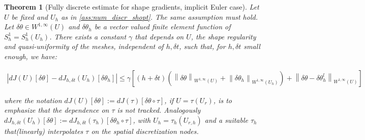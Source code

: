 \documentclass[english,a4paper,9pt,oneside]{scrbook}	%
\theoremstyle{break}
\newtheorem{thm}[equation]{Theorem}
\theoremstyle{remark}
\newcommand{\norm}[1]{\left\lVert#1\right\rVert}
\newcommand{\te}{\theta}
\begin{document}
\begin{thm}[Fully discrete estimate for shape gradients, implicit Euler case]
\label{thm:ie_shape_grad_est}
Let  $U$ be fixed and $U_h$ as in \cref{ass:num_discr_shopt}. The same assumption must hold. Let $\delta \te \in W^{1,\infty}(U)$ and $\delta \te_h$ be a vector valued finite element function of $S^1_h=S^1_h(U_h)$. There exists a constant $\gamma$ that depends on $U$, the shape regularity and quasi-uniformity of the meshes, independent of $h, \delta t$, such that, for $h,\delta t$ small enough, we have:

\begin{align*}
|dJ(	U)[\delta \te]-dJ_{h,\delta t}(U_h)[\delta \te_h]|\leq \gamma\left [ (h+\delta t)(\norm{\delta \te}_{W^{1,\infty}(U)}+\norm{\delta \te_h}_{W^{1,\infty}(U_h)}) + \norm{\delta \te - \delta \te_h^l}_{W^{1,\infty}(U)}\right ]
\end{align*}

where the notation $dJ(U)[\delta \te]:=dJ(\tau)[\delta \te\circ \tau]$, if $U=\tau(U_r)$, is to emphasize that the dependence on $\tau$ is not tracked.
Analogously $dJ_{h,\delta t}(U_h)[\delta \te]:=dJ_{h,\delta t}(\tau_h)[\delta \te_h\circ \tau]$, with $U_h = \tau_h(U_{r,h})$ and a suitable $\tau_h$ that(linearly) interpolates $\tau$ on the spatial discretization nodes.

\end{thm}
\end{document}
